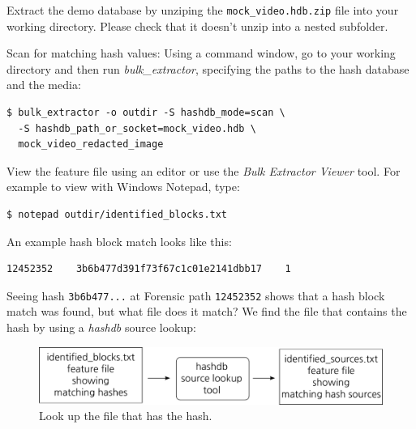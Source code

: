 \documentclass[12pt,twoside]{article}
\newcommand{\hdb}{\emph{hashdb}\xspace}
\newcommand{\bulk}{\emph{bulk\_extractor}\xspace}
\newcommand{\bev}{\emph{Bulk Extractor Viewer}\xspace}
\begin{document}
\begin{compactenum}
\item Extract the demo database
by unziping the \texttt{mock\_video.hdb.zip} file
into your working directory.
Please check that it doesn't unzip into a nested subfolder.
\item Scan for matching hash values: Using a command window, go to your working directory and then run \bulk,
specifying the paths to the hash database and the media:
\begin{verbatim}
$ bulk_extractor -o outdir -S hashdb_mode=scan \
  -S hashdb_path_or_socket=mock_video.hdb \
  mock_video_redacted_image
\end{verbatim}
\item View the feature file using an editor or use the \bev tool.
For example to view with Windows Notepad, type:
\begin{verbatim}
$ notepad outdir/identified_blocks.txt
\end{verbatim}
An example hash block match looks like this:
\begin{verbatim}
12452352    3b6b477d391f73f67c1c01e2141dbb17    1
\end{verbatim}
\end{compactenum}

Seeing hash \texttt{3b6b477...} at Forensic path \texttt{12452352}
shows that a hash block match was found, but what file does it match?
We find the file that contains the hash by using a \hdb source lookup:
\begin{figure}[H]
  \center
  \includegraphics[scale=0.6]{drawings/source_lookup}
  \caption*{Look up the file that has the hash.}
  \label{fig:source_lookup}
\end{figure}
\end{document}
